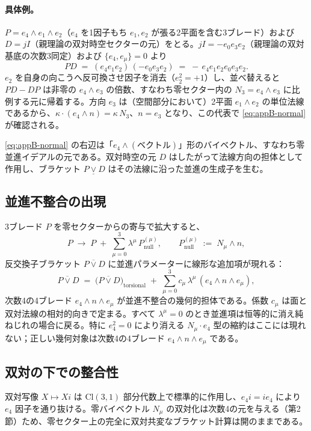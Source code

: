 \documentclass[dvipdfmx,11pt,a4paper]{article}
\theoremstyle{definition}
\theoremstyle{plain}
\theoremstyle{remark}
\begin{document}
\paragraph{具体例。}
$P = e_{4}\wedge e_{1}\wedge e_{2}$（$e_{4}$ を1因子もち $e_{1},e_{2}$ が張る2平面を含む3ブレード）および $D=jI$（親理論の双対時空セクターの元）をとる。$jI=-e_{0}e_{3}e_{2}$（親理論の双対基底の次数3同定）および $\{e_{4},e_{\mu}\}=0$ より
\[
PD \;=\; (e_{4}e_{1}e_{2})\,(-e_{0}e_{3}e_{2}) \;=\; -\,e_{4}e_{1}e_{2}e_{0}e_{3}e_{2}.
\]
$e_{2}$ を自身の向こうへ反可換させ因子を消去（$e_{2}^{2}=+1$）し、並べ替えると $PD-DP$ は非零の $e_{4}\wedge e_{3}$ の倍数、すなわち零セクター内の $N_{3}=e_{4}\wedge e_{3}$ に比例する元に帰着する。方向 $e_{3}$ は（空間部分において）2平面 $e_{1}\wedge e_{2}$ の単位法線であるから、$\kappa\cdot(e_{4}\wedge n) = \kappa\,N_{3}$、$n=e_{3}$ となり、この代表で \eqref{eq:appB-normal} が確認される。

\eqref{eq:appB-normal} の右辺は「$e_{4}\wedge(\text{ベクトル})$」形のバイベクトル、すなわち零並進イデアルの元である。双対時空の元 $D$ はしたがって法線方向の担体として作用し、ブラケット $P\mathbin{\underline{\vee}}D$ はその法線に沿った並進の生成子を生む。

\subsection{並進不整合の出現}

3ブレード $P$ を零セクターからの寄与で拡大すると、
\[
P \;\to\; P \;+\; \sum_{\mu=0}^{3}\lambda^{\mu}\,P^{(\mu)}_{\text{null}},
\qquad
P^{(\mu)}_{\text{null}} \;:=\; N_{\mu}\wedge n,
\]
反交換子ブラケット $P\mathbin{\overline{\vee}}D$ に並進パラメーターに線形な追加項が現れる：
\[
P \mathbin{\overline{\vee}} D
\;=\; \bigl(P\mathbin{\overline{\vee}}D\bigr)_{\text{torsional}}
\;+\; \sum_{\mu=0}^{3} c_{\mu}\,\lambda^{\mu}\,(e_{4}\wedge n\wedge e_{\mu}),
\]
次数4の4ブレード $e_{4}\wedge n\wedge e_{\mu}$ が並進不整合の幾何的担体である。係数 $c_{\mu}$ は面と双対法線の相対的向きで定まる。すべて $\lambda^{\mu}=0$ のとき並進項は恒等的に消え純ねじれの場合に戻る。特に $e_{4}^{2}=0$ により消える $N_{\mu}\cdot e_{4}$ 型の縮約はここには現れない；正しい幾何対象は次数4の4ブレード $e_{4}\wedge n\wedge e_{\mu}$ である。

\subsection{双対の下での整合性}

双対写像 $X\mapsto Xi$ は $\mathrm{Cl}(3,1)$ 部分代数上で標準的に作用し、$e_{4}i=ie_{4}$ により $e_{4}$ 因子を通り抜ける。零バイベクトル $N_{\mu}$ の双対化は次数4の元を与える（第2節）ため、零セクター上の完全に双対共変なブラケット計算は開のままである。
\end{document}
